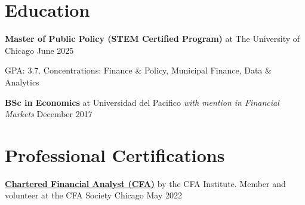 \renewcommand{\subsection}[3]{
    \noindent\textbf{#1}  {#2} \hfill #3
}
\section{Education}
\subsection{Master of Public Policy (STEM Certified Program)}{at The University of Chicago}{June 2025}

GPA: 3.7. Concentrations: Finance \& Policy, Municipal Finance, Data \& Analytics

\subsection{BSc in Economics}{at Universidad del Pacifico 
\textit{with mention in Financial Markets}
}{December 2017}

\section{Professional Certifications}
\subsection{\href{https://directory.cfainstitute.org/profile/272E08C8D736165FB8BDFD7CEDAA3CBB1EDE5A5A?event=memberDirectoryProfileView}{\textbf{Chartered Financial Analyst (CFA)}}}{by the CFA Institute. Member and volunteer at the CFA Society Chicago}{May 2022}

